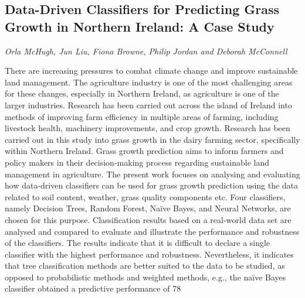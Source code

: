 \documentclass[../booklet.tex]{subfiles}
\begin{document}
\subsection[Data-Driven Classifiers for Predicting Grass Growth in Northern Ireland: A Case Study. {\it Orla McHugh, Jun Liu, Fiona Browne, Philip Jordan and Deborah McConnell}]{Data-Driven Classifiers for Predicting Grass Growth in Northern Ireland: A Case Study}
    

\begin{center}
  {\it Orla McHugh, Jun Liu, Fiona Browne, Philip Jordan and Deborah McConnell}
\end{center}

\vskip 0.8cm

There are increasing pressures to combat climate change and improve sustainable land management. The agriculture industry is one of the most challenging areas for these changes, especially in Northern Ireland, as agriculture is one of the larger industries. Research has been carried out across the island of Ireland into methods of improving farm efficiency in multiple areas of farming, including livestock health, machinery improvements, and crop growth. Research has been carried out in this study into grass growth in the dairy farming sector, specifically within Northern Ireland. Grass growth prediction aims to inform farmers and policy makers in their decision-making process regarding sustainable land management in agriculture. The present work focuses on analysing and evaluating how data-driven classifiers can be used for grass growth prediction using the data related to soil content, weather, grass quality components etc. Four classifiers, namely Decision Trees, Random Forest, Naïve Bayes, and Neural Networks, are chosen for this purpose. Classification results based on a real-world data set are analysed and compared to evaluate and illustrate the performance and robustness of the classifiers. The results indicate that it is difficult to declare a single classifier with the highest performance and robustness. Nevertheless, it indicates that tree classification methods are better suited to the data to be studied, as opposed to probabilistic methods and weighted methods, e.g., the naïve Bayes classifier obtained a predictive performance of 78%
\end{document}
